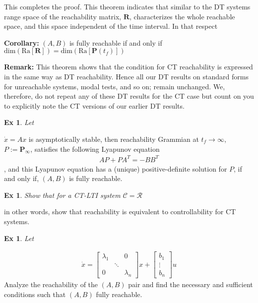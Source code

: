 \documentclass[twoside]{article}
\newtheorem{exmp}[theorem]{Ex}
\begin{document}
%
This completes the proof. This theorem indicates that similar to the DT systems range space of the
reachability matrix, $\mathbf{R}$, characterizes the whole reachable space, and this space independent
of the time interval. In that respect 

\textbf{Corollary:} $(A,B)$ is fully reachable if and only if $\mathrm{dim} \left( \mathrm{Ra} [ \mathbf{R} ] \right) = \mathrm{dim} \left( \mathrm{Ra} [ \textbf{P}(t_f) ] \right)$

\textbf{Remark:} This theorem shows that the condition for CT reachability is expressed in the same way 
as DT reachability. Hence all our DT results on standard forms for unreachable systems, modal tests, and so on; remain unchanged. We, therefore, do not repeat any of these DT results for the CT case but count on you to explicitly note the CT versions of our earlier DT results.

\begin{exmp}
Let 
\end{exmp}
$\dot{x} = A x$ is asymptotically stable, then reachability Grammian at $t_f \to \infty$, $P := \mathbf{P}_{\infty}$,
satisfies the following Lyapunov equation
%
\begin{align*}
    A P + P A^T = - B B^T
\end{align*}
% 
, and this Lyapunov equation has a (unique) positive-definite solution for $P$,
if and only if, $(A,B)$ is fully reachable.

\begin{exmp}
Show that for a CT-LTI system $\mathcal{C} = \mathcal{R}$
\end{exmp}
in other words, show that reachability is equivalent to
controllability for CT systems. 

\begin{exmp}
Let 
\end{exmp}
%
%
\begin{align*}
    \dot{x} = \begin{bmatrix} \lambda_1 & & 0  \\
    & \ddots &
    \\
    0 & &  \lambda_n 
    \end{bmatrix} x + \begin{bmatrix} b_1 \\ \vdots \\ b_n \end{bmatrix} u
\end{align*}
% 
Analyze the reachability of the $(A,B)$ pair and
find the necessary and sufficient conditions such that 
$(A,B)$ fully reachable.
\end{document}
